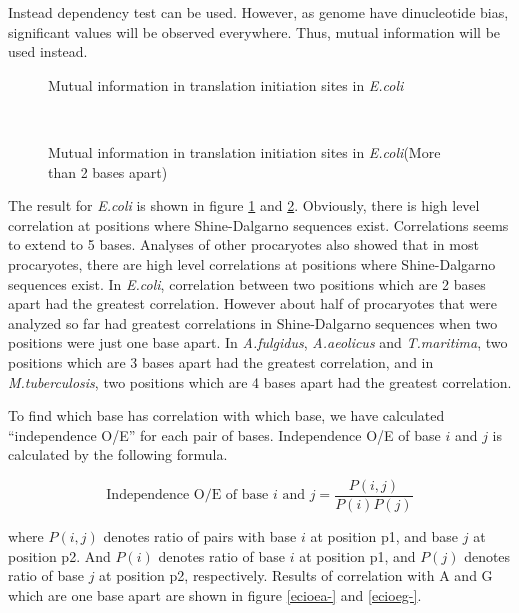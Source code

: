 Instead dependency test can be used. However, as genome have
dinucleotide bias, significant values will be observed
everywhere. Thus, mutual information will be used instead.

\begin{figure}
\begin{center}
\end{center}
\caption{Mutual information in translation initiation sites in {\it E.coli}}
\label{miec1}
\end{figure}


\begin{figure}
\begin{center}
\\
\end{center}
\caption{Mutual information in translation initiation sites in {\it E.coli}(More than 2 bases apart)}
\label{miec3}
\end{figure}

The result for {\it E.coli} is shown in figure \ref{miec1} and
\ref{miec3}.  Obviously, there is high level correlation at positions
where Shine-Dalgarno sequences exist. Correlations seems to extend to 5
bases. Analyses of other procaryotes also showed that in most
procaryotes, there are high level correlations at positions where
Shine-Dalgarno sequences exist. In {\it E.coli}, correlation between two
positions which are 2 bases apart had the greatest correlation.  However
about half of procaryotes that were analyzed so far had greatest
correlations in Shine-Dalgarno sequences when two positions were just
one base apart. In {\it A.fulgidus}, {\it A.aeolicus} and {\it
T.maritima}, two positions which are 3 bases apart had the greatest
correlation, and in {\it M.tuberculosis}, two positions which are 4
bases apart had the greatest correlation.

To find which base has correlation with which base, we have calculated
``independence O/E'' for each pair of bases. Independence O/E of base
\(i\) and \(j\) is calculated by the following formula.

\[
\mbox{Independence O/E of base \(i\) and \(j\)} = \frac{P(i, j)}{P(i)P(j)}
\]

\noindent
where \(P(i,j)\) denotes ratio of pairs with base \(i\) at position
p1, and base \(j\) at position p2. And \(P(i)\) denotes ratio of base
\(i\) at position p1, and \(P(j)\) denotes ratio of base \(j\) at
position p2, respectively. Results of correlation with A and G which are one
base apart are shown in figure \ref{ecioea-} and \ref{ecioeg-}.


